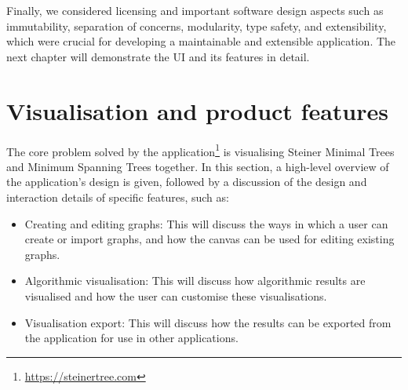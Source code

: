 \documentclass{l4proj}
\begin{document}
Finally, we considered licensing and  important software design aspects such as immutability, separation of concerns, modularity, type safety, and extensibility, which were crucial for developing a maintainable and extensible application. The next chapter will demonstrate the UI and its features in detail.


\chapter{Visualisation and product features}
\label{sec:visualisation_and_product_features}
The core problem solved by the application\footnote{\url{https://steinertree.com}} is visualising Steiner Minimal Trees and Minimum Spanning Trees together.
In this section, a high-level overview of the application's design is given, followed by a discussion of the design and interaction details of specific features, such as:
\begin{itemize}
    \item Creating and editing graphs: This will discuss the ways in which a user can create or import graphs, and how the canvas can be used for editing existing graphs.
    \item Algorithmic visualisation: This will discuss how algorithmic results are visualised and how the user can customise these visualisations.
    \item Visualisation export: This will discuss how the results can be exported from the application for use in other applications.
\end{itemize}
\end{document}

